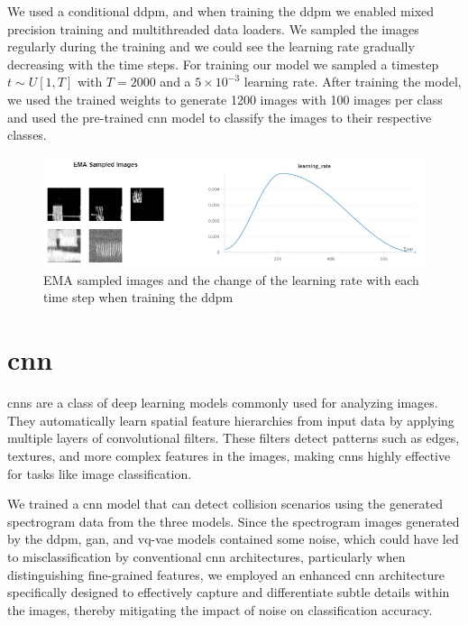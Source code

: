 We used a conditional \gls{ddpm}, and when training the \gls{ddpm} we enabled mixed precision training and multithreaded data loaders. We sampled the images regularly during the training and we could see the learning rate gradually decreasing with the time steps. 
For training our model we sampled a timestep $t\sim U[1,T]$ with $T=2000$ and a $5\times10^{-3}$ learning rate.
After training the model, we used the trained weights to generate 1200 images with 100 images per class and used the pre-trained \gls{cnn} model to classify the images to their respective classes. 
\begin{figure}[h]
\includegraphics[width=\textwidth]{figures/ema_learning_rate.jpg}
\centering
\caption{EMA sampled images and the change of the learning rate with each time step when training the \gls{ddpm} }
\centering
\end{figure}
\section{\gls{cnn}}
\gls{cnn}s are a class of deep learning models commonly used for analyzing images. They automatically learn spatial feature hierarchies from input data by applying multiple layers of convolutional filters.
These filters detect patterns such as edges, textures, and more complex features in the images, making \gls{cnn}s highly effective for tasks like image classification.


We trained a \gls{cnn} model that can detect collision scenarios using the generated spectrogram data from the three models. 
Since the spectrogram images generated by the \gls{ddpm}, \gls{gan}, and \gls{vq-vae} models contained some noise, which could have led to misclassification by conventional \gls{cnn} architectures, particularly when distinguishing fine-grained features,  we employed an enhanced \gls{cnn} architecture specifically designed to effectively capture and differentiate subtle details within the images, thereby mitigating the impact of noise on classification accuracy.

